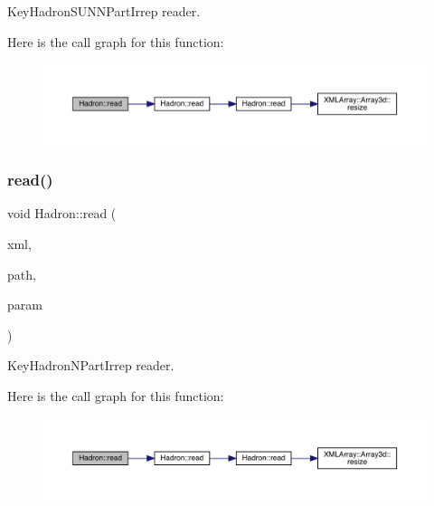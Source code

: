 Key\+Hadron\+S\+U\+N\+N\+Part\+Irrep reader. 

Here is the call graph for this function\+:
\nopagebreak
\begin{figure}[H]
\begin{center}
\leavevmode
\includegraphics[width=350pt]{d1/daf/namespaceHadron_a6ee3d9a9ffb4f6e626fa1a73b49c9ee0_cgraph}
\end{center}
\end{figure}
\mbox{\label{namespaceHadron_ac345c2bc828c82e6774e6bc01e57535e}} 
\subsubsection{\texorpdfstring{read()}{read()}\hspace{0.1cm}{\footnotesize\ttfamily [72/94]}}
{\footnotesize\ttfamily void Hadron\+::read (\begin{DoxyParamCaption}\item[{\mbox{\hyperlink{classADATXML_1_1XMLReader}{X\+M\+L\+Reader}} \&}]{xml,  }\item[{const std\+::string \&}]{path,  }\item[{\mbox{\hyperlink{structHadron_1_1KeyHadronNPartIrrepOp__t}{Key\+Hadron\+N\+Part\+Irrep\+Op\+\_\+t}} \&}]{param }\end{DoxyParamCaption})}



Key\+Hadron\+N\+Part\+Irrep reader. 

Here is the call graph for this function\+:
\nopagebreak
\begin{figure}[H]
\begin{center}
\leavevmode
\includegraphics[width=350pt]{d1/daf/namespaceHadron_ac345c2bc828c82e6774e6bc01e57535e_cgraph}
\end{center}
\end{figure}
\mbox{\label{namespaceHadron_a0dee7d09d7d8dd3947cd5a0c3c4c0447}} 
